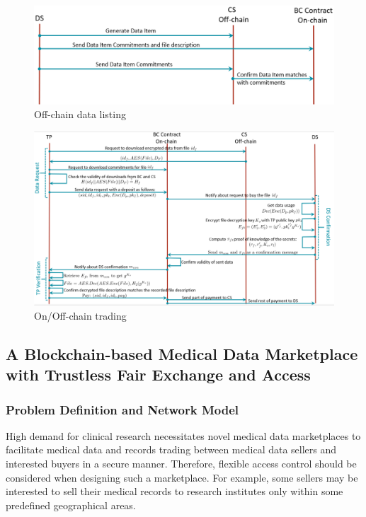 \begin{figure}
\centering
  \includegraphics[width=1\linewidth]{imgs/22-sequenceDataListing.eps}
  \caption{Off-chain data listing}
  \label{fig:22-off-chain-data-listing}
\end{figure}

\begin{figure}
\centering
  \includegraphics[width=1\linewidth]{imgs/22-sequenceTrading.eps}
  \caption{On/Off-chain trading}
  \label{fig:22-off-chain-trading}
\end{figure}

\subsection{A Blockchain-based Medical Data Marketplace with Trustless Fair Exchange and Access~\cite{alsharif2020blockchain}}
\label{sec:blockchain-based-medical-data-marketplace-20}

\subsubsection{Problem Definition and Network Model}
High demand for clinical research necessitates novel medical data marketplaces to facilitate medical data and records trading between medical data sellers and interested buyers in a secure manner.
Therefore, flexible access control should be considered when designing such a marketplace.
For example, some sellers may be interested to sell their medical records to research institutes only within some predefined geographical areas.

